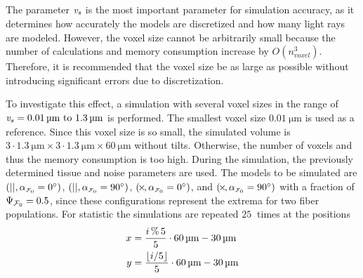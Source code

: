 \subsection{\Voxelsize{} \texorpdfstring{\voxelsize{}}{}}
%
The parameter \Voxelsize{} $\textnormal{$\mathit{v_{s}}$}$ is the most important parameter for simulation accuracy, as it determines how accurately the models are discretized and how many light rays are modeled.
However, the voxel size cannot be arbitrarily small because the number of calculations and memory consumption increase by $O(n_{\mathit{voxel}}^3)$.
Therefore, it is recommended that the voxel size be as large as possible without introducing significant errors due to discretization.
\par
%
To investigate this effect, a simulation with several voxel sizes in the range of $\voxelsize = \SIrange{0.01}{1.3}{\micro\meter}$ is performed.
The smallest voxel size $\SI{0.01}{\micro\meter}$ is used as a reference.
Since this voxel size is so small, the simulated volume is $3 \cdot \SI{1.3}{\micro\meter} \times 3 \cdot \SI{1.3}{\micro\meter} \times \SI{60}{\micro\meter}$ without tilts.
Otherwise, the number of voxels and thus the memory consumption is too high.
During the simulation, the previously determined tissue and noise parameters are used.
The models to be simulated are $(||,\modelInc = \SI{0}{\degree})$, $(||,\modelInc = \SI{90}{\degree})$, $(\!\times\!, \modelInc = \SI{0}{\degree})$, and $(\!\times\!,\modelInc = \SI{90}{\degree})$ with a fraction of $\textnormal{$\Psi_{\textnormal{$\mathcal{F}_0$}}$} = \SI{0.5}{}$, since these configurations represent the extrema for two fiber populations.
For statistic the simulations are repeated $\SI{25}{}$ times at the positions
\begin{align}
\begin{split}
    x&=\frac{i\,\%\,5}{5} \cdot \SI{60}{\micro\meter} - \SI{30}{\micro\meter} \\
    y&=\frac{\lfloor i/5\rfloor}{5} \cdot \SI{60}{\micro\meter} - \SI{30}{\micro\meter} 
\end{split}
\end{align}
% 
% 
% 

